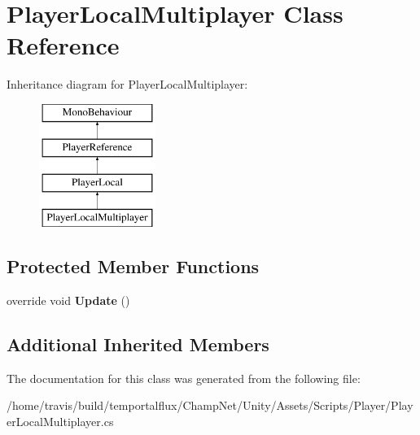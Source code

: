 \hypertarget{class_player_local_multiplayer}{\section{Player\-Local\-Multiplayer Class Reference}
\label{class_player_local_multiplayer}
}
Inheritance diagram for Player\-Local\-Multiplayer\-:\begin{figure}[H]
\begin{center}
\leavevmode
\includegraphics[height=4.000000cm]{class_player_local_multiplayer}
\end{center}
\end{figure}
\subsection*{Protected Member Functions}
\begin{DoxyCompactItemize}
\item 
\hypertarget{class_player_local_multiplayer_af8786075d98c26839e861fcf3cb3fbf8}{override void {\bfseries Update} ()}\label{class_player_local_multiplayer_af8786075d98c26839e861fcf3cb3fbf8}

\end{DoxyCompactItemize}
\subsection*{Additional Inherited Members}


The documentation for this class was generated from the following file\-:\begin{DoxyCompactItemize}
\item 
/home/travis/build/temportalflux/\-Champ\-Net/\-Unity/\-Assets/\-Scripts/\-Player/Player\-Local\-Multiplayer.\-cs\end{DoxyCompactItemize}
